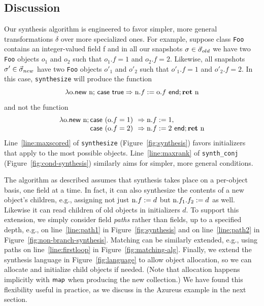 \documentclass[natbib,10pt]{sigplanconf}
\newcommand{\code}[1]{\lstinline|#1|\xspace}
\begin{document}
\subsection{Discussion}
\label{sec:synth-discuss}

Our synthesis algorithm is engineered to favor simpler, more general
transformations $\delta$ over more specialized ones.  For example,
suppose class \code{Foo} contains an integer-valued field \textsf{f}
and in all our snapshots $\sigma \in \vec{\sigma}_{old}$ we have two
\code{Foo} objects $o_1$ and $o_2$ such that $o_1.f = 1$ and $o_2.f = 2$.  Likewise, all
snapshots $\sigma' \in \vec{\sigma}_{new}$ have two \code{Foo} objects $o'_1$ and
$o'_2$ such that $o'_1.f = 1$ and $o'_2.f = 2$.  In this case,
\code{synthesize} will produce the function $$\lambda \textrm{o}. \mathsf{new}\ \textrm{n};\, \textsf{case } \mathsf{true} \Rightarrow \textrm{n}.f := \textrm{o}.f \textsf{ end};
\textbf{ret}\ \textrm{n}$$ and not the function 
$$\begin{array}{r@{~~}l}
\lambda \oldvar. \anew \newvar; \casestart (\oldvar.f = 1) &\carrow \newvar.f := 1,\\
\casestart (\oldvar.f = 2) &\carrow \newvar.f := 2\caseend; \return\ \newvar
\end{array}
$$
Line~\ref{line:maxscored} of \code{synthesize}
(Figure~\ref{fig:synthesis}) favors initializers that apply to the
most possible objects.  Line~\ref{line:maxrank} of \code{synth_conj}
(Figure~\ref{fig:cond-synthesis}) similarly aims for simpler, more
general conditions.

The algorithm as described assumes that synthesis takes place on a
per-object basis, one field at a time.  In fact, it can also
synthesize the contents of a new object's children, e.g., assigning
not just $\textrm{n}.f := d$ but $\textrm{n}.f_1.f_2 := d$ as well.
Likewise it can read children of old objects in initializers $d$.  To
support this extension, we simply consider field \emph{paths} rather
than fields, up to a specified depth, e.g., on line~\ref{line:path1}
in Figure~\ref{fig:synthesis} and on line~\ref{line:path2} in
Figure~\ref{fig:non-branch-synthesis}.  Matching can be similarly
extended, e.g., using paths on line~\ref{line:firstloop} in
Figure~\ref{fig:matching-alg}.  Finally, we extend the synthesis
language in Figure~\ref{fig:language} to allow object allocation, so we can
allocate and initialize child objects if needed.  (Note that
allocation happens implicitly with $\textsf{map}$ when producing the new
collection.)  We have found this flexibility useful in practice, as we
discuss in the Azureus example in the next section.
\end{document}
